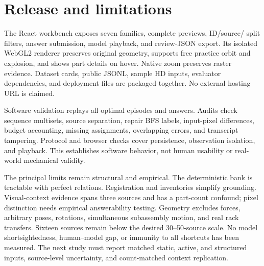 \documentclass[10pt,twocolumn,letterpaper]{article}
\begin{document}
\section{Release and limitations}
The React workbench exposes seven families, complete previews, ID/source/
split filters, answer submission, model playback, and review-JSON export.
Its isolated WebGL2 renderer preserves original geometry, supports free
practice orbit and explosion, and shows part details on hover.
Native zoom preserves raster evidence. Dataset cards, public JSONL,
sample HD inputs, evaluator dependencies, and deployment files are
packaged together. No external hosting URL is claimed.

Software validation replays all \EpisodeCount{} optimal episodes and
\ProbeCount{} answers. Audits check sequence multisets, source separation,
repair BFS labels, input-pixel differences, budget accounting, missing
assignments, overlapping errors, and transcript tampering. Protocol and
browser checks cover persistence, observation isolation, and playback.
This establishes software behavior, not human usability or real-world
mechanical validity.

The principal limits remain structural and empirical. The deterministic
bank is tractable with perfect relations. Registration and inventories
simplify grounding. Visual-context evidence spans three sources and has
a part-count confound; pixel distinction needs empirical answerability
testing. Geometry excludes forces, arbitrary poses, rotations,
simultaneous subassembly motion, and real rack transfers. Sixteen sources
remain below the desired 30--50-source scale. No model shortsightedness,
human--model gap, or immunity to all shortcuts has been measured.
The next study must report matched static, active, and structured inputs,
source-level uncertainty, and count-matched context replication.

\newpage
{\small


}
\end{document}
